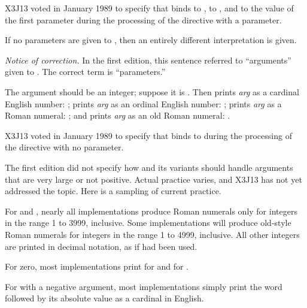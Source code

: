 \begin{flushdesc}
\begin{new}
X3J13 voted in January 1989
to specify that  binds 
to ,  to , and  to the value
of the first parameter
during the processing of the  directive with a parameter.
\end{new}

If no parameters are given to , then an entirely different
interpretation is given.
\begin{new}%
{\it Notice of correction.}
In the first edition, this sentence referred to ``arguments'' given to .
The correct term is ``parameters.''
\end{new}
The argument should be an integer;
suppose it is . Then
 prints {\it arg} as a cardinal English number: ;
 prints {\it arg} as an ordinal English number: ;
 prints {\it arg} as a Roman numeral: ; and
 prints {\it arg} as an old Roman numeral: .

\begin{new}
X3J13 voted in January 1989
to specify that  binds  to 
during the processing of the  directive with no parameter.
\end{new}

\begin{new}
The first edition did not specify how  and its variants should
handle arguments that are very large or not positive.  Actual practice varies,
and X3J13 has not yet addressed the topic.
Here is a sampling of current practice.

For  and , nearly all implementations
produce Roman numerals only for integers in the range 1 to 3999, inclusive.
Some implementations will produce old-style Roman numerals for integers in
the range 1 to 4999, inclusive.  All other integers are printed in decimal
notation, as if  had been used.

For zero, most implementations print  for 
and  for .

For  with a negative argument, most implementations simply print
the word  followed by its absolute value as a cardinal in English.


\end{new}
\end{flushdesc}
